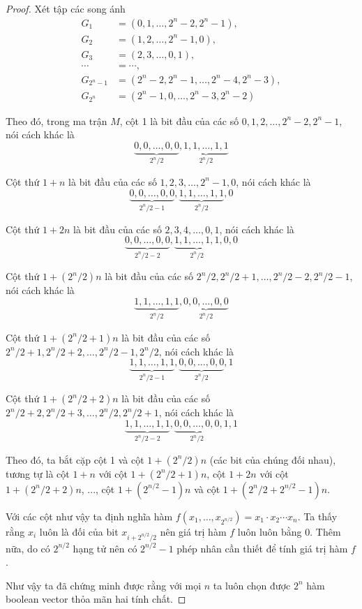 \documentclass{article}
\begin{document}
\begin{proof}
    Xét tập các song ánh 
    \begin{align*}
        G_1 & = (0, 1, \ldots, 2^n-2, 2^n-1), \\
        G_2 & = (1, 2, \ldots, 2^n-1, 0), \\
        G_3 & = (2, 3, \ldots, 0, 1), \\
        \cdots & = \cdots, \\
        G_{2^n-1} & = (2^n-2, 2^n-1, \ldots, 2^n-4, 2^n-3), \\
        G_{2^n} & = (2^n-1, 0, \ldots, 2^n-3, 2^n-2)
    \end{align*}

    Theo đó, trong ma trận $M$, cột 1 là bit đầu của các số $0, 1, 2, \ldots, 2^n-2, 2^n-1$, nói cách khác là \[ \underbrace{0, 0, \ldots, 0, 0}_{2^{n} / 2}, \underbrace{1, 1, \ldots, 1, 1}_{2^{n} / 2} \]

    Cột thứ $1+n$ là bit đầu của các số $1, 2, 3, \ldots, 2^n-1, 0$, nói cách khác là \[ \underbrace{0, 0, \ldots, 0, 0}_{2^n/2-1}, \underbrace{1, 1, \ldots, 1, 1}_{2^n/2}, 0 \]

    Cột thứ $1+2n$ là bit đầu của các số $2, 3, 4, \ldots, 0, 1$, nói cách khác là \[ \underbrace{0, 0, \ldots, 0, 0}_{2^n/2 - 2}, \underbrace{1, 1, \ldots, 1, 1}_{2^n/2}, 0, 0 \]


    Cột thứ $1 + (2^n/2)n$ là bit đầu của các số $2^n/2, 2^n/2+1, \ldots, 2^n/2-2,2^n/2-1$, nói cách khác là \[ \underbrace{1, 1, \ldots, 1, 1}_{2^n/2}, \underbrace{0, 0, \ldots, 0, 0}_{2^n/2} \]

    Cột thứ $1 + (2^n/2+1)n$ là bit đầu của các số $2^n/2+1, 2^n/2+2, \ldots, 2^n/2-1, 2^n/2$, nói cách khác là \[ \underbrace{1, 1, \ldots, 1, 1}_{2^n/2-1}, \underbrace{0, 0, \ldots, 0, 0}_{2^n/2}, 1 \]

    Cột thứ $1 + (2^n/2+2)n$ là bit đầu của các số $2^n/2+2, 2^n/2+3, \ldots, 2^n/2, 2^n/2+1$, nói cách khác là \[\underbrace{1, 1, \ldots, 1, 1}_{2^n/2-2}, \underbrace{0, 0, \ldots, 0, 0}_{2^n/2}, 1, 1 \]
    
    Theo đó, ta bắt cặp cột 1 và cột $1 + (2^n/2)n$ (các bit của chúng đối nhau), tương tự là cột $1+n$ với cột $1+(2^n/2+1)n$, cột $1+2n$ với cột $1 + (2^n/2+2)n$, ..., cột $1+(2^{n/2}-1)n$ và cột $1+(2^n/2+2^{n/2}-1)n$.

    Với các cột như vậy ta định nghĩa hàm $f(x_1, \ldots, x_{2^{n/2}}) = x_1 \cdot x_2 \cdots x_n$. Ta thấy rằng $x_i$ luôn là đối của bit $x_{i+2^{n/2}/2}$ nên giá trị hàm $f$ luôn luôn bằng 0. Thêm nữa, do có $2^{n/2}$ hạng tử nên có $2^{n/2}-1$ phép nhân cần thiết để tính giá trị hàm $f$.

    Như vậy ta đã chứng minh được rằng với mọi $n$ ta luôn chọn được $2^n$ hàm boolean vector thỏa mãn hai tính chất.
\end{proof}
\end{document}
